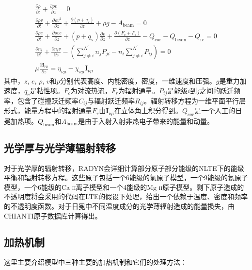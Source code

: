 \begin{gather}
	\frac{\partial \rho}{\partial t}+\frac{\partial \rho v}{\partial z}=0 \\
	\frac{\partial \rho v}{\partial t}+\frac{\partial \rho v^{2}}{\partial z}+\frac{\partial\left(p+q_{\mathrm{v}}\right)}{\partial z}+\rho g-A_{\mathrm{beam}}=0  \\
	\frac{\partial \rho e}{\partial t} +\frac{\partial \rho v e}{\partial z}+\left(p+q_{\mathrm{v}}\right) \frac{\partial v}{\partial z} +\frac{\partial\left(F_{\mathrm{c}}+F_{\mathrm{r}}\right)}{\partial z}-Q_{\mathrm{cor}}-Q_{\mathrm{beam}}-Q_{\mathrm{rc}}=0 \\
	\frac{\partial n_{i}}{\partial t}+\frac{\partial n_{i} v}{\partial z}-\left(\sum_{j \neq i}^{N^{\prime}} n_{j} P_{j i}-n_{i} \sum_{j \neq i}^{N^{\prime}} P_{i j}\right)=0 \\
	\mu \frac{\partial \boldsymbol{I}_{\nu \mu}}{\partial z}=\eta_{\nu \mu}-\chi_{\nu \mu} \boldsymbol{I}_{\nu \mu}
\end{gather}
其中，$z$, $e$, $\rho$, $v$和$p$分别代表高度、内能密度，密度，一维速度和压强。$g$是重力加速度，$q_v$是粘性项。$F_c$为对流热流，$F_r$为辐射通量。$P_{ij}$是能级$i$到$j$之间的跃迁频率，包含了碰撞跃迁频率$C_{ij}$与辐射跃迁频率$R_{ij}$。辐射转移方程为一维平面平行层形式，能量方程中的辐射通量$F_r$由$\boldsymbol{I}_{\nu\mu}$在立体角上积分得到。$Q_{cor}$是一个人工的日冕加热项。$Q_{\mathrm{beam}}$和$A_{\mathrm{beam}}$是由于入射入射非热电子带来的能量和动量。

\subsection{光学厚与光学薄辐射转移}
对于光学厚的辐射转移，RADYN会详细计算部分原子部分能级的NLTE下的能级平衡和辐射转移方程。这些原子包括一个6能级的氢原子模型，一个9能级的氦原子模型，一个6能级的Ca \textsc{ii}离子模型和一个4能级的Mg \textsc{ii}原子模型。剩下原子造成的不透明度将会采用\textcites{Gustafsson1973}的代码在LTE的假设下处理，给出一个依赖于温度、密度和频率的不透明度函数。对于日冕中不同温度成分的光学薄辐射造成的能量损失，由CHIANTI原子数据库\parencites{Dere1997,Landi2013}计算得出。
\subsection{加热机制}
这里主要介绍模型中三种主要的加热机制和它们的处理方法：


